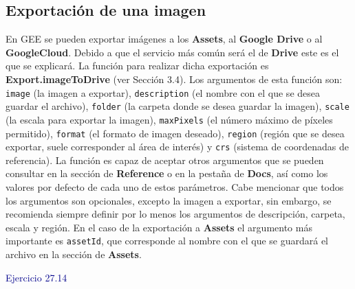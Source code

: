 \documentclass[
  12pt,
  letterpaper,
  twoside]{book}
\newcommand\boldpurple[1]{\textcolor{darkpurple}{\textbf{#1}}}
\begin{document}
\hypertarget{exportaciuxf3n-de-una-imagen}{%
\subsection*{Exportación de una imagen}\label{exportaciuxf3n-de-una-imagen}}

En GEE se pueden exportar imágenes a los \textbf{Assets}, al \textbf{Google Drive} o al \textbf{GoogleCloud}. Debido a que el servicio más común será el de \textbf{Drive} este es el que se explicará. La función para realizar dicha exportación es \boldpurple{Export.imageToDrive} (ver Sección 3.4). Los argumentos de esta función son: \texttt{image} (la imagen a exportar), \texttt{description} (el nombre con el que se desea guardar el archivo), \texttt{folder} (la carpeta donde se desea guardar la imagen), \texttt{scale} (la escala para exportar la imagen), \texttt{maxPixels} (el número máximo de píxeles permitido), \texttt{format} (el formato de imagen deseado), \texttt{region} (región que se desea exportar, suele corresponder al área de interés) y \texttt{crs} (sistema de coordenadas de referencia). La función es capaz de aceptar otros argumentos que se pueden consultar en la sección de \textbf{Reference} o en la pestaña de \textbf{Docs}, así como los valores por defecto de cada uno de estos parámetros. Cabe mencionar que todos los argumentos son opcionales, excepto la imagen a exportar, sin embargo, se recomienda siempre definir por lo menos los argumentos de descripción, carpeta, escala y región. En el caso de la exportación a \textbf{Assets} el argumento más importante es \texttt{assetId}, que corresponde al nombre con el que se guardará el archivo en la sección de \textbf{Assets}.

\textcolor{darkblue}{Ejercicio 27.14}
\end{document}
